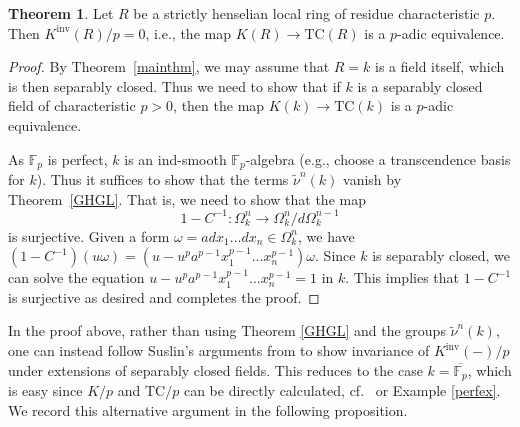 \documentclass{amsart}
\newcommand{\knf}{K^{\mathrm{inv}}}
\theoremstyle{definition}
\newtheorem{theorem}[definition]{Theorem}
\newcommand{\TC}{\mathrm{TC}}
\begin{document}
\begin{theorem} 
\label{etalekthm}
Let $R$ be a strictly henselian local ring of residue characteristic $p$. Then $\knf(R)/p =0$, i.e., the map $K(R) \to \TC(R)$ is a
$p$-adic equivalence. 
\end{theorem} 
\begin{proof} By
Theorem~\ref{mainthm}, we may assume that $R=k$ is a field itself, which is
then separably closed. 
Thus we need to show that if $k$ is a separably closed field of characteristic
$p > 0$, then the map $K(k) \to \TC(k)$ is a $p$-adic equivalence. 

As $\mathbb{F}_p$ is perfect, $k$ is an ind-smooth $\mathbb{F}_p$-algebra (e.g., choose
a transcendence basis for $k$).  Thus it suffices to show that the terms
$\widetilde{\nu}^n(k)$ vanish by Theorem~\ref{GHGL}. 
That is, we need to show that the map
\[ 1  - C^{-1}: \Omega^n_k \to \Omega^n_k/ d \Omega^{n-1}_k  \]
is surjective. 
Given a form $\omega = a dx_1 \dots dx_n \in \Omega^n_k$, we have
$(1 - C^{-1})(u \omega) = (u - u^p a^{p-1} x_1^{p-1} \dots x_n^{p-1}) \omega$. 
Since $k$ is separably closed, 
we can solve the equation $
u - u^p a^{p-1} x_1^{p-1} \dots x_n^{p-1} = 1$ in $k$. This implies that $1 -
C^{-1}$ is surjective as desired and completes the proof. 
\end{proof} 

In the proof above, rather than using Theorem \ref{GHGL} and the groups
$\widetilde{\nu}^n(k)$, one can instead follow Suslin's arguments from
\cite{Suslinalgclosed} to show invariance of $\knf(-)/p$ under extensions of
separably closed fields.  This reduces to the case $k=\overline{\mathbb{F}_p}$,
which is easy since $K/p$ and $\TC/p$ can be directly calculated, cf.~\cite{HM97, Qui} or Example \ref{perfex}.
We record this alternative argument in the following proposition. 
\end{document}
